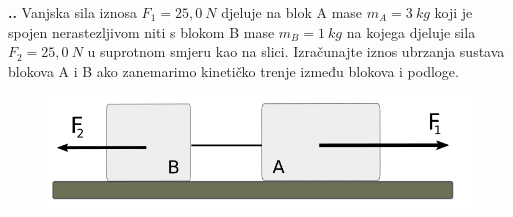 


\noindent 
\textbf{
\thecjelina.\thezadatak.}
Vanjska sila iznosa $F_1=25,0\ N$ djeluje na blok A mase $m_A=3\ kg$ koji je spojen nerastezljivom niti s blokom B mase $m_B=1\ kg$ na kojega djeluje sila $F_2=25,0\ N$ u  suprotnom smjeru kao na slici. Izračunajte iznos ubrzanja sustava blokova A i B ako zanemarimo kinetičko trenje između blokova i podloge.


\begin{figure}[h]%
  \begin{center}
    \includegraphics[scale=0.35]{../03_Dinamika_materijalne_tocke/Zadatak_D308.png}
  \end{center}
\end{figure}


